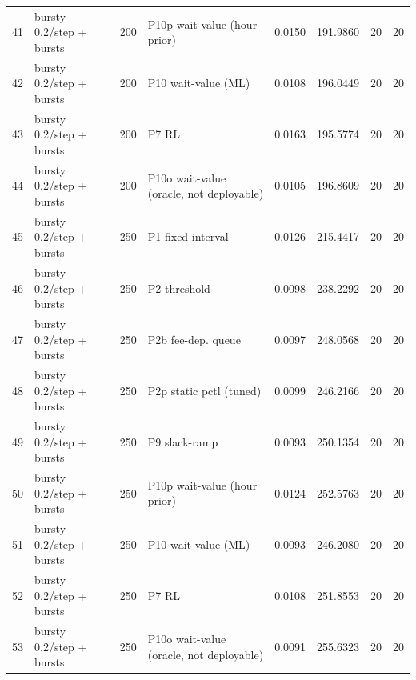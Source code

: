 \begin{tabular}{llrlrrrr}
41 & bursty 0.2/step + bursts & 200 & P10p wait-value (hour prior) & 0.0150 & 191.9860 & 20 & 20 \\
42 & bursty 0.2/step + bursts & 200 & P10 wait-value (ML) & 0.0108 & 196.0449 & 20 & 20 \\
43 & bursty 0.2/step + bursts & 200 & P7 RL & 0.0163 & 195.5774 & 20 & 20 \\
44 & bursty 0.2/step + bursts & 200 & P10o wait-value (oracle, not deployable) & 0.0105 & 196.8609 & 20 & 20 \\
45 & bursty 0.2/step + bursts & 250 & P1 fixed interval & 0.0126 & 215.4417 & 20 & 20 \\
46 & bursty 0.2/step + bursts & 250 & P2 threshold & 0.0098 & 238.2292 & 20 & 20 \\
47 & bursty 0.2/step + bursts & 250 & P2b fee-dep. queue & 0.0097 & 248.0568 & 20 & 20 \\
48 & bursty 0.2/step + bursts & 250 & P2p static pctl (tuned) & 0.0099 & 246.2166 & 20 & 20 \\
49 & bursty 0.2/step + bursts & 250 & P9 slack-ramp & 0.0093 & 250.1354 & 20 & 20 \\
50 & bursty 0.2/step + bursts & 250 & P10p wait-value (hour prior) & 0.0124 & 252.5763 & 20 & 20 \\
51 & bursty 0.2/step + bursts & 250 & P10 wait-value (ML) & 0.0093 & 246.2080 & 20 & 20 \\
52 & bursty 0.2/step + bursts & 250 & P7 RL & 0.0108 & 251.8553 & 20 & 20 \\
53 & bursty 0.2/step + bursts & 250 & P10o wait-value (oracle, not deployable) & 0.0091 & 255.6323 & 20 & 20 \\
\bottomrule
\end{tabular}
